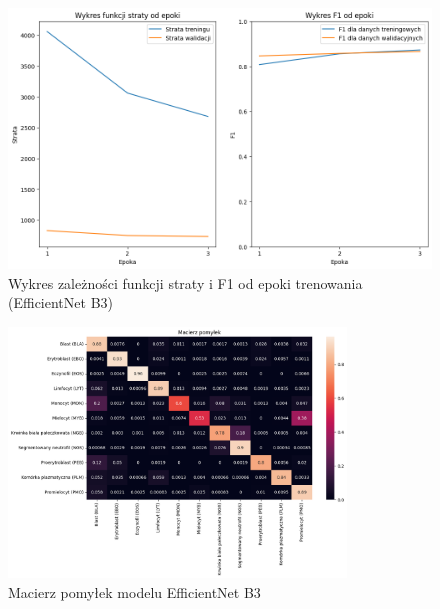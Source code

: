 \begin{figure}
    \centering
    \includegraphics[width=\textwidth]{experiments/efficientnet_b3/combined}
    \caption{Wykres zależności funkcji straty i F1 od epoki trenowania (EfficientNet B3)}
    \label{fig:plot_efficientnet_b3}
\end{figure}
\begin{figure}
    \centering
    \includegraphics[width=0.8\textwidth]{experiments/efficientnet_b3/confusion_matrix}
    \caption{Macierz pomyłek modelu EfficientNet B3}
    \label{fig:confusion_efficientnet_b3}
\end{figure}

